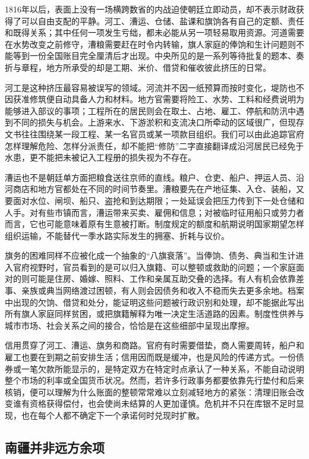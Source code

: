 1816年以后，表面上没有一场横跨数省的内战迫使朝廷立即动员，却不表示财政获得了可以自由支配的平静。河工、漕运、仓储、盐课和旗饷各有自己的定额、责任和既得关系；其中任何一项发生亏绌，都未必能从另一项轻易取用资源。河道需要在水势改变之前修守，漕粮需要赶在时令内转输，旗人家庭的俸饷和生计问题则不能等到一份全国账目完全厘清后才出现。中央所见的是一系列等待批复的题本、奏折与章程，地方所承受的却是工期、米价、借贷和催收彼此挤压的日常。

河工是这种挤压最容易被误写的领域。河流并不因一纸预算而按时变化，堤防也不因获准修筑便自动具备人力和材料。地方官需要将险工、水势、工料和经费说明为能够进入部议的事项；工程所在的居民则会在取土、占地、雇工、停航和防汛中遇到不同的损失与机会。上游来水、下游淤积和支流决口所牵动的区域很广，但现存文书往往围绕某一段工程、某一名官员或某一项款目组织。我们可以由此追踪官府怎样理解危险、怎样分派责任，却不能把“修防”二字直接翻译成沿河居民已经免于水患，更不能把未被记入工程册的损失视为不存在。

漕运也不是朝廷单方面把粮食送往京师的直线。粮户、仓吏、船户、押运人员、沿河商店和地方官都处在不同的时间节奏里。漕粮要先在产地征集、入仓、装船，又要面对水位、闸坝、船只、盗抢和到达期限；一处延误会把压力传到下一处仓储和人手。对有些市镇而言，漕运带来买卖、雇佣和信息；对被临时征用船只或劳力者而言，它也可能意味着原有生意被打断。制度规定的额度和航期说明国家期望怎样组织运输，不能替代一季水路实际发生的拥塞、折耗与议价。

旗务的困难同样不应被化成一个抽象的“八旗衰落”。当俸饷、债务、典当和生计进入官府视野时，官员看到的是可以归入旗籍、可以整顿或救助的问题；一个家庭面对的则可能是住房、婚嫁、照料、工作和亲属互助交叠的选择。有人有机会依靠差事、亲族或典当网络渡过困顿，有人则会因债务和收入不稳而失去更多余地。档案中出现的欠饷、借贷和处分，能证明这些问题被行政识别和处理，却不能据此写出所有旗人家庭同样贫困，或把旗籍解释为唯一决定生活道路的因素。制度性供养与城市市场、社会关系之间的接合，恰恰是在这些细部中呈现出摩擦。

信用贯穿了河工、漕运、旗务和商路。官府有时需要借垫，商人需要周转，船户和雇工也要在到期之前安排生活；信用因而既是缓冲，也是风险的传递方式。一份债券或一笔欠款所能显示的，是特定双方在特定时点承认了一种关系，不能自动说明整个市场的利率或全国货币状况。然而，若许多行政事务都要依靠先行垫付和后来核销，便可以理解为什么账面的整顿常常难以立刻减轻地方的紧张：清理旧账会改变谁有资格获得偿付，也会使尚未结算的人更加谨慎。危机并不只在库银不足时显现，也在每个人都不确定下一个承诺何时兑现时扩散。

\subsection{南疆并非远方余项}

